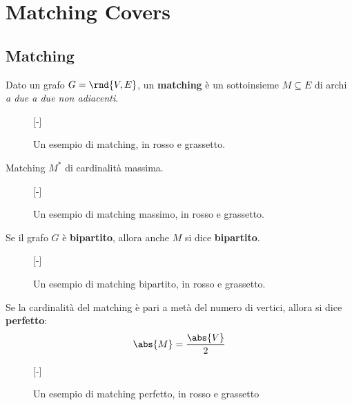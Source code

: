 \documentclass[\main/main.tex]{subfiles}
\begin{document}
\chapter{Matching Covers}

\section{Matching}
\setlength\columnsep{25pt}
\begin{multicols}{2}
	\begin{definition}
		Dato un grafo \(G=\rnd{V, E}\), un \textbf{matching} è un sottoinsieme \(M\subseteq E\) di archi \textit{a due a due non adiacenti}.
		\begin{figure}
			[-]
			\MatchingDefinition{}
			\caption{Un esempio di matching, in rosso e grassetto.}
		\end{figure}
	\end{definition}
	\begin{definition}
		Matching \(M^*\) di cardinalità massima.
		\begin{figure}
			[-]
			\MatchingDefinition{}
			\caption{Un esempio di matching massimo, in rosso e grassetto.}
		\end{figure}
	\end{definition}
	\begin{definition}
		Se il grafo \(G\) è \textbf{bipartito}, allora anche \(M\) si dice \textbf{bipartito}.
		\begin{figure}
			[-]
			\MatchingDefinition{}
			\caption{Un esempio di matching bipartito, in rosso e grassetto.}
		\end{figure}
	\end{definition}
	\begin{definition}
		Se la cardinalità del matching è pari a metà del numero di vertici, allora si dice \textbf{perfetto}:
		\[
			\abs{M} = \frac{\abs{V}}{2}
		\]
		\begin{figure}
			[-]
			\MatchingDefinition{}
			\caption{Un esempio di matching perfetto, in rosso e grassetto}
		\end{figure}
	\end{definition}
\end{multicols}
\end{document}
